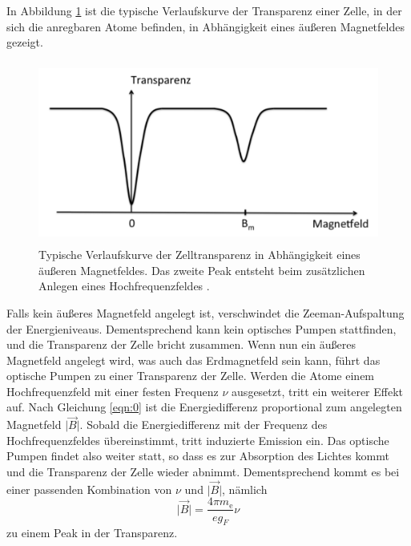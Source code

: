 In Abbildung \ref{fig:theorie4} ist die typische Verlaufskurve der Transparenz einer Zelle, in der sich die anregbaren Atome befinden, in Abhängigkeit eines äußeren Magnetfeldes gezeigt.

\begin{figure}
  \centering
  \includegraphics[height=6cm]{ressources/theorie4.png}
  \caption{Typische Verlaufskurve der Zelltransparenz in Abhängigkeit eines äußeren Magnetfeldes. Das zweite Peak entsteht beim zusätzlichen Anlegen eines Hochfrequenzfeldes \cite{skript}.}
  \label{fig:theorie4}
\end{figure}

Falls kein äußeres Magnetfeld angelegt ist, verschwindet die Zeeman-Aufspaltung der Energieniveaus.
Dementsprechend kann kein optisches Pumpen stattfinden, und die Transparenz der Zelle bricht zusammen.
Wenn nun ein äußeres Magnetfeld angelegt wird, was auch das Erdmagnetfeld sein kann, führt das optische Pumpen zu einer Transparenz der Zelle.
Werden die Atome einem Hochfrequenzfeld mit einer festen Frequenz $\nu$ ausgesetzt, tritt ein weiterer Effekt auf.
Nach Gleichung \eqref{eqn:0} ist die Energiedifferenz proportional zum angelegten Magnetfeld $\lvert \vec{B} \rvert$.
Sobald die Energiedifferenz mit der Frequenz des Hochfrequenzfeldes übereinstimmt, tritt induzierte Emission ein.
Das optische Pumpen findet also weiter statt, so dass es zur Absorption des Lichtes kommt und die Transparenz der Zelle wieder abnimmt.
Dementsprechend kommt es bei einer passenden Kombination von $\nu$ und $\lvert \vec{B} \rvert$, nämlich
\begin{equation}
  \lvert \vec{B} \rvert = \frac{4 \pi m_\text{e}}{e g_F} \nu
  \label{eqn:resonanz}
\end{equation}
zu einem Peak in der Transparenz.

